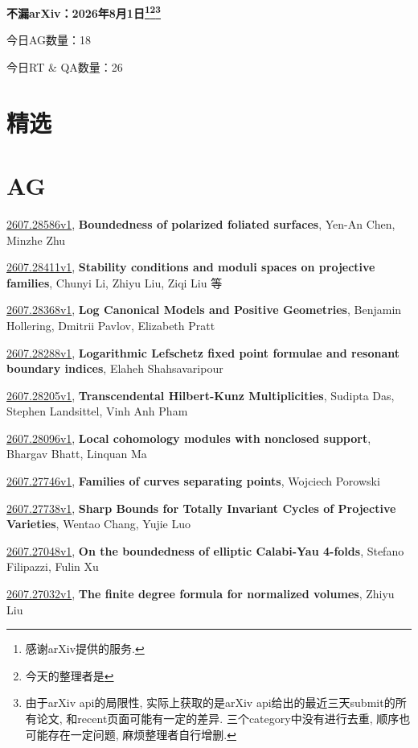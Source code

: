 \documentclass[9pt, a4paper]{article}
\theoremstyle{plain}
\theoremstyle{definition}
\theoremstyle{remark}
\newcommand{\arxiv}[3]{\href{https://arxiv.org/abs/#1}{#1}, \textbf{\textcolor{arxivblue}{#2}}, #3}
\newcommand{\AGnumber}{18}
\newcommand{\RTQAnumber}{26}
\newcommand{\NewestDate}{2026年8月1日}
\newcommand{\todayarXiver}{} %
\begin{document}
\begin{center}
    \Huge\textbf{不漏arXiv：\NewestDate\footnote{感谢arXiv提供的服务.}\footnote{今天的整理者是\todayarXiver}\footnote{由于arXiv api的局限性, 实际上获取的是arXiv api给出的最近三天submit的所有论文, 和recent页面可能有一定的差异. 三个category中没有进行去重, 顺序也可能存在一定问题, 麻烦整理者自行增删.}} \\
\end{center}

\setcounter{section}{-1}

\begin{center}
    今日AG数量：\AGnumber
    
    今日RT \& QA数量：\RTQAnumber
    
\end{center}


\section{精选}


\section{AG}
\arxiv{2607.28586v1}{Boundedness of polarized foliated surfaces}{Yen-An Chen, Minzhe Zhu}

\arxiv{2607.28411v1}{Stability conditions and moduli spaces on projective families}{Chunyi Li, Zhiyu Liu, Ziqi Liu 等}

\arxiv{2607.28368v1}{Log Canonical Models and Positive Geometries}{Benjamin Hollering, Dmitrii Pavlov, Elizabeth Pratt}

\arxiv{2607.28288v1}{Logarithmic Lefschetz fixed point formulae and resonant boundary indices}{Elaheh Shahsavaripour}

\arxiv{2607.28205v1}{Transcendental Hilbert-Kunz Multiplicities}{Sudipta Das, Stephen Landsittel, Vinh Anh Pham}

\arxiv{2607.28096v1}{Local cohomology modules with nonclosed support}{Bhargav Bhatt, Linquan Ma}

\arxiv{2607.27746v1}{Families of curves separating points}{Wojciech Porowski}

\arxiv{2607.27738v1}{Sharp Bounds for Totally Invariant Cycles of Projective Varieties}{Wentao Chang, Yujie Luo}

\arxiv{2607.27048v1}{On the boundedness of elliptic Calabi-Yau 4-folds}{Stefano Filipazzi, Fulin Xu}

\arxiv{2607.27032v1}{The finite degree formula for normalized volumes}{Zhiyu Liu}
\end{document}
